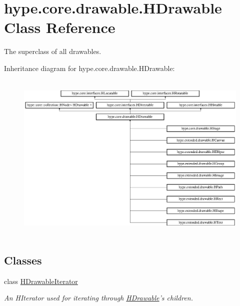 \hypertarget{classhype_1_1core_1_1drawable_1_1_h_drawable}{\section{hype.\-core.\-drawable.\-H\-Drawable Class Reference}
\label{classhype_1_1core_1_1drawable_1_1_h_drawable}
}


The superclass of all drawables.  


Inheritance diagram for hype.\-core.\-drawable.\-H\-Drawable\-:\begin{figure}[H]
\begin{center}
\leavevmode
\includegraphics[height=8.235294cm]{classhype_1_1core_1_1drawable_1_1_h_drawable}
\end{center}
\end{figure}
\subsection*{Classes}
\begin{DoxyCompactItemize}
\item 
class \hyperlink{classhype_1_1core_1_1drawable_1_1_h_drawable_1_1_h_drawable_iterator}{H\-Drawable\-Iterator}
\begin{DoxyCompactList}\small\item\em An H\-Iterator used for iterating through \hyperlink{classhype_1_1core_1_1drawable_1_1_h_drawable}{H\-Drawable}'s children. \end{DoxyCompactList}\end{DoxyCompactItemize}
